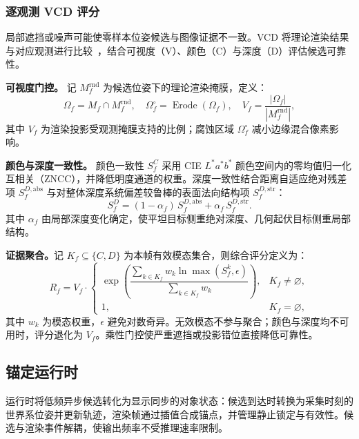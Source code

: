 \documentclass[review]{vgtc}
\begin{document}
\subsubsection{逐观测 VCD 评分}

局部遮挡或噪声可能使零样本位姿候选与图像证据不一致。VCD 将理论渲染结果与对应观测进行比较~\cite{deepim2018,latentfusion2020,focalpose2022}，结合可视度（V）、颜色（C）与深度（D）评估候选可靠性。

\textbf{可视度门控。}
记 $M_f^{\mathrm{rnd}}$ 为候选位姿下的理论渲染掩膜，定义：
\begin{equation}
\Omega_f = M_f \cap M_f^{\mathrm{rnd}}, \quad \Omega_f^{\circ} = \operatorname{Erode}(\Omega_f), \quad V_f = \frac{|\Omega_f|}{|M_f^{\mathrm{rnd}}|},
\label{eq:visibility}
\end{equation}
其中 $V_f$ 为渲染投影受观测掩膜支持的比例；腐蚀区域 $\Omega_f^\circ$ 减小边缘混合像素影响。

\textbf{颜色与深度一致性。}
颜色一致性 $S_f^C$ 采用 CIE $L^*a^*b^*$ 颜色空间内的零均值归一化互相关（ZNCC），并降低明度通道的权重。深度一致性结合距离自适应绝对残差项 $S_f^{D,\mathrm{abs}}$ 与对整体深度系统偏差较鲁棒的表面法向结构项 $S_f^{D,\mathrm{str}}$：
\begin{equation}
S_f^D = (1-\alpha_f)\,S_f^{D,\mathrm{abs}} + \alpha_f\,S_f^{D,\mathrm{str}}.
\label{eq:depth-score}
\end{equation}
其中 $\alpha_f$ 由局部深度变化确定，使平坦目标侧重绝对深度、几何起伏目标侧重局部结构。

\textbf{证据聚合。}记 $K_f\subseteq\{C,D\}$ 为本帧有效模态集合，则综合评分定义为：
\begin{equation}
R_f = V_f \cdot
\begin{cases}
\exp\!\left(\dfrac{\sum_{k \in K_f} w_k \ln \max(S_f^{k}, \epsilon)}{\sum_{k \in K_f} w_k}\right), & K_f \neq \varnothing, \\[6pt]
1, & K_f = \varnothing,
\end{cases}
\label{eq:vcd}
\end{equation}
其中 $w_k$ 为模态权重，$\epsilon$ 避免对数奇异。无效模态不参与聚合；颜色与深度均不可用时，评分退化为 $V_f$。乘性门控使严重遮挡或投影错位直接降低可靠性。

\subsection{锚定运行时}\label{sec:anchoring}

运行时将低频异步候选转化为显示同步的对象状态：候选到达时转换为采集时刻的世界系位姿并更新轨迹，渲染帧通过插值合成锚点，并管理静止锁定与有效性。候选与渲染事件解耦，使输出频率不受推理速率限制。
\end{document}
